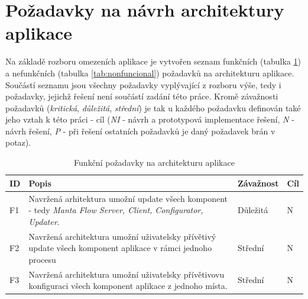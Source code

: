 \section{Požadavky na návrh architektury aplikace}
\label{sec:ana_requiremets}
Na základě rozboru omezeních aplikace je vytvořen seznam funkčních (tabulka \ref{tab:funcional}) a nefunkčních (tabulka \ref{tab:nonfuncional}) požadavků na architekturu aplikace. Součástí seznamu jsou všechny požadavky vyplývající z rozboru výše, tedy i požadavky, jejichž řešení není součástí zadání této práce. Kromě závažnosti požadavků (\textit{kritická}, \textit{důležitá}, \textit{střední}) je tak u každého požadavku definován také jeho vztah k této práci - cíl (\textit{NI} - návrh a prototypová implementace řešení, \textit{N} - návrh řešení, \textit{P} - při řešení ostatních požadavků je daný požadavek brán v potaz).

\begin{table}[h!]
\begin{center}
\centering
\caption{Funkční požadavky na architekturu aplikace}
\label{tab:funcional}
\begin{tabular}{|p{1cm}|p{9cm}|p{2cm}|p{1cm}|}
	\hline
    ID & Popis & Závažnost & Cíl \\ \hline

	 F1 & Navržená arhitektura umožní update všech komponent - tedy \textit{Manta Flow Server, Client, Configurator, Updater}. & Důležitá & N \\ \hline

	 F2 & Navržená architektura umožní uživatelsky přívětivý update všech komponent aplikace v rámci jednoho procesu & Střední & N \\ \hline

	 F3 & Navržená architektura umožní uživatelsky přívětivovu konfiguraci všech komponent aplikace z jednoho místa. & Střední & N \\ \hline
 \end{tabular}
 \end{center}
 \end{table}

